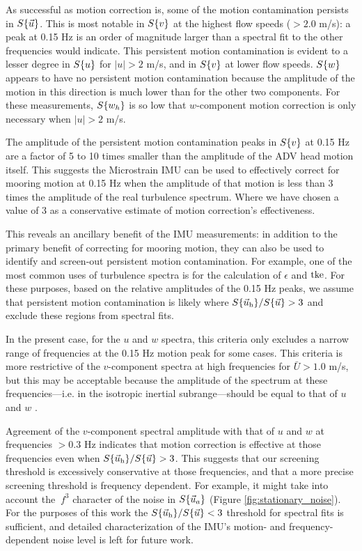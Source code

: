 As successful as motion correction is, some of the motion contamination persists in $S\{\vec{u}\}$. This is most notable in $S\{v\}$ at the highest flow speeds ($>2.0$ m/s): a peak at 0.15 Hz is an order of magnitude larger than a spectral fit to the other frequencies would indicate. This persistent motion contamination is evident to a lesser degree in $S\{u\}$ for $|u|>2$ m/s, and in $S\{v\}$ at lower flow speeds.  $S\{w\}$ appears to have no persistent motion contamination because the amplitude of the motion in this direction is much lower than for the other two components. For these measurements, $S\{w_h\}$ is so low that $w$-component motion correction is only necessary when $|u| > 2$ m/s.

The amplitude of the persistent motion contamination peaks in $S\{v\}$ at 0.15 Hz are a factor of 5 to 10 times smaller than the amplitude of the ADV head motion itself. This suggests the Microstrain IMU can be used to effectively correct for mooring motion at 0.15 Hz when the amplitude of that motion is less than 3 times the amplitude of the real turbulence spectrum. Where we have chosen a value of 3 as a conservative estimate of motion correction's effectiveness.

This reveals an ancillary benefit of the IMU measurements: in addition to the primary benefit of correcting for mooring motion, they can also be used to identify and screen-out persistent motion contamination. For example, one of the most common uses of turbulence spectra is for the calculation of $\epsilon$ and $\mathrm{tke}$. For these purposes, based on the relative amplitudes of the 0.15 Hz peaks, we assume that persistent motion contamination is likely where $S\{\vec{u}_\mathrm{h}\}/S\{\vec{u}\} > 3$ and exclude these regions from spectral fits.

In the present case, for the $u$ and $w$ spectra, this criteria only excludes a narrow range of frequencies at the 0.15 Hz motion peak for some cases. This criteria is more restrictive of the $v$-component spectra at high frequencies for $\bar U > 1.0$ m/s, but this may be acceptable because the amplitude of the spectrum at these frequencies---i.e. in the isotropic inertial subrange---should be equal to that of $u$ and $w$ \citep[]{Kolmogorov1941c}.

Agreement of the $v$-component spectral amplitude with that of $u$ and $w$ at frequencies $>0.3$ Hz indicates that motion correction is effective at those frequencies even when $S\{\vec{u}_\mathrm{h}\}/S\{\vec{u}\} > 3$. This suggests that our screening threshold is excessively conservative at those frequencies, and that a more precise screening threshold is frequency dependent. For example, it might take into account the $~f^3$ character of the noise in $S\{\vec{u}_a\}$ (Figure \ref{fig:stationary_noise}). For the purposes of this work the $S\{\vec{u}_\mathrm{h}\}/S\{\vec{u}\} < 3$ threshold for spectral fits is sufficient, and detailed characterization of the IMU's motion- and frequency-dependent noise level is left for future work.

